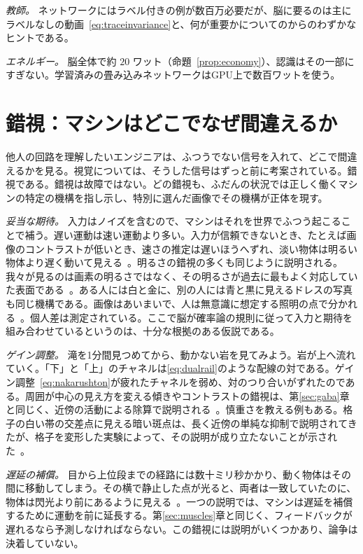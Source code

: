 \emph{教師。} ネットワークにはラベル付きの例が数百万必要だが、脳に要るのは主にラベルなしの動画~\eqref{eq:traceinvariance}と、何が重要かについてのからのわずかなヒントである。

\emph{エネルギー。} 脳全体で約 $20$ ワット（命題~\ref{prop:economy}）、認識はその一部にすぎない。学習済みの畳み込みネットワークはGPU上で数百ワットを使う。

\section{錯視：マシンはどこでなぜ間違えるか}
\label{sec:illusions}

他人の回路を理解したいエンジニアは、ふつうでない信号を入れて、どこで間違えるかを見る。視覚については、そうした信号はずっと前に考案されている。錯視である。錯視は故障ではない。どの錯視も、ふだんの状況では正しく働くマシンの特定の機構を指し示し、特別に選んだ画像でその機構が正体を現す。

\emph{妥当な期待。} 入力はノイズを含むので、マシンはそれを世界でふつう起こることで補う。遅い運動は速い運動より多い。入力が信頼できないとき、たとえば画像のコントラストが低いとき、速さの推定は遅いほうへずれ、淡い物体は明るい物体より遅く動いて見える~\cite{Weiss2002}。明るさの錯視の多くも同じように説明される。我々が見るのは画素の明るさではなく、その明るさが過去に最もよく対応していた表面である~\cite{Purves2011}。ある人には白と金に、別の人には青と黒に見えるドレスの写真も同じ機構である。画像はあいまいで、人は無意識に想定する照明の点で分かれる~\cite{LaferSousa2015,Wallisch2017}。個人差は測定されている。ここで脳が確率論の規則に従って入力と期待を組み合わせているというのは、十分な根拠のある仮説である。

\emph{ゲイン調整。} 滝を1分間見つめてから、動かない岩を見てみよう。岩が上へ流れていく。「下」と「上」のチャネルは\eqref{eq:dualrail}のような配線の対である。ゲイン調整~\eqref{eq:nakarushton}が疲れたチャネルを弱め、対のつり合いがずれたのである。周囲が中心の見え方を変える傾きやコントラストの錯視は、第\ref{sec:gaba}章と同じく、近傍の活動による除算で説明される~\cite{Schwartz2009}。慎重さを教える例もある。格子の白い帯の交差点に見える暗い斑点は、長く近傍の単純な抑制で説明されてきたが、格子を変形した実験によって、その説明が成り立たないことが示された~\cite{SchillerCarvey2005}。

\emph{遅延の補償。} 目から上位段までの経路には数十ミリ秒かかり、動く物体はその間に移動してしまう。その横で静止した点が光ると、両者は一致していたのに、物体は閃光より前にあるように見える~\cite{Nijhawan1994}。一つの説明では、マシンは遅延を補償するために運動を前に延長する。第\ref{sec:muscles}章と同じく、フィードバックが遅れるなら予測しなければならない。この錯視には説明がいくつかあり、論争は決着していない。

